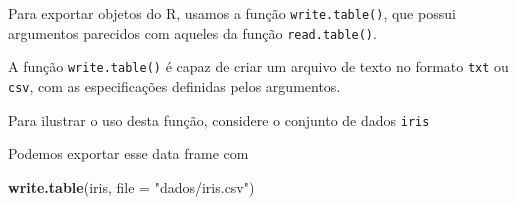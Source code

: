 \documentclass[10pt,a4paper]{book}
\newenvironment{Shaded}{\begin{snugshade}}{\end{snugshade}}
\newcommand{\KeywordTok}[1]{\textcolor[rgb]{0.13,0.29,0.53}{\textbf{#1}}}
\newcommand{\DataTypeTok}[1]{\textcolor[rgb]{0.13,0.29,0.53}{#1}}
\newcommand{\DecValTok}[1]{\textcolor[rgb]{0.00,0.00,0.81}{#1}}
\newcommand{\FloatTok}[1]{\textcolor[rgb]{0.00,0.00,0.81}{#1}}
\newcommand{\StringTok}[1]{\textcolor[rgb]{0.31,0.60,0.02}{#1}}
\newcommand{\OperatorTok}[1]{\textcolor[rgb]{0.81,0.36,0.00}{\textbf{#1}}}
\newcommand{\ErrorTok}[1]{\textcolor[rgb]{0.64,0.00,0.00}{\textbf{#1}}}
\newcommand{\NormalTok}[1]{#1}
\begin{document}
Para exportar objetos do R, usamos a função \texttt{write.table()}, que
possui argumentos parecidos com aqueles da função \texttt{read.table()}.

A função \texttt{write.table()} é capaz de criar um arquivo de texto no
formato \texttt{txt} ou \texttt{csv}, com as especificações definidas
pelos argumentos.

Para ilustrar o uso desta função, considere o conjunto de dados
\texttt{iris}

\begin{Shaded}
\end{Shaded}

Podemos exportar esse data frame com

\begin{Shaded}
\begin{Highlighting}[]
\KeywordTok{write.table}\NormalTok{(iris, }\DataTypeTok{file =} \StringTok{"dados/iris.csv"}\NormalTok{)}
\end{Highlighting}
\end{Shaded}
\end{document}

